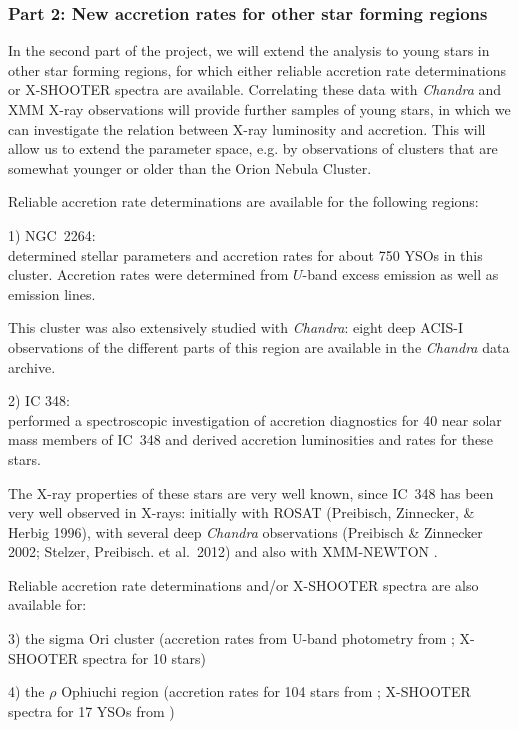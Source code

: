 \documentclass[10pt,fleqn,twoside]{article}
\begin{document}
\subsubsection*{Part 2: New accretion rates for other star forming regions}

In the second part of the project, we will extend the analysis to young stars in other
star forming regions, for which either reliable accretion rate determinations
or X-SHOOTER spectra are available.
Correlating these data with \textit{Chandra} and XMM X-ray 
observations will provide
further samples of young stars, in which we can investigate the
relation between X-ray luminosity and accretion.
%
This will allow us to extend the parameter space, e.g. by observations
of clusters that are somewhat younger or older than the Orion Nebula Cluster.

Reliable accretion rate determinations are available for the
following regions:
\medskip


{1) NGC~2264:}\\
\citet{Venuti14} determined stellar parameters and accretion rates for about 
750 YSOs in this cluster. Accretion rates were determined from $U$-band excess emission
as well as emission lines. 

This cluster was also extensively studied with \textit{Chandra}: eight deep ACIS-I
observations of the different parts of this region are available in the 
\textit{Chandra} data archive.
\medskip

2) IC 348:\\
\citet{Dahm08} performed a spectroscopic investigation of accretion
diagnostics for 40 near solar mass members of IC~348
and derived accretion luminosities and rates for these stars.

The X-ray properties of these stars are very well known, since IC~348
has been very well observed in X-rays: initially with
ROSAT (Preibisch, Zinnecker, \& Herbig 1996), with
several deep \textit{Chandra} observations (Preibisch \& Zinnecker 2002;
Stelzer, Preibisch. et al.~2012) and also with XMM-NEWTON \citep{PZ04}.
\medskip

Reliable accretion rate determinations and/or X-SHOOTER spectra are also
available for:\smallskip


3) the sigma Ori cluster (accretion rates from U-band photometry from \citet{Rigliaco11};
X-SHOOTER spectra  for 10 stars)
\smallskip

4) the $\rho$ Ophiuchi region (accretion rates for 104 stars from \citet{Natta06};
X-SHOOTER spectra for 17 YSOs from \citet{Manara15})
\smallskip
\end{document}
